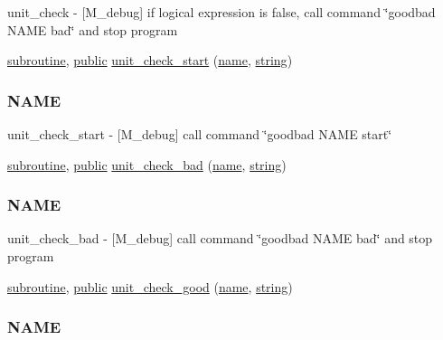 \begin{DoxyCompactItemize}
\begin{DoxyCompactList}
unit\+\_\+check -\/ \mbox{[}M\+\_\+debug\mbox{]} if logical expression is false, call command \char`\"{}goodbad N\+A\+M\+E bad\char`\"{} and stop program \end{DoxyCompactList}\item 
\hyperlink{M__stopwatch_83_8txt_acfbcff50169d691ff02d4a123ed70482}{subroutine}, \hyperlink{M__stopwatch_83_8txt_a2f74811300c361e53b430611a7d1769f}{public} \hyperlink{namespacem__debug_a6f1166b1f25f39931359c1aa1b2219e5}{unit\+\_\+check\+\_\+start} (\hyperlink{M__stopwatch_83_8txt_a3f508a893ae4c3b397b4383e33b9bcae}{name}, \hyperlink{what__overview_81_8txt_a74cb7e955273b9f9157b4f0c18a38849}{string})
\begin{DoxyCompactList}\small\item\em \subsubsection*{N\+A\+ME}

unit\+\_\+check\+\_\+start -\/ \mbox{[}M\+\_\+debug\mbox{]} call command \char`\"{}goodbad N\+A\+M\+E start\char`\"{} \end{DoxyCompactList}\item 
\hyperlink{M__stopwatch_83_8txt_acfbcff50169d691ff02d4a123ed70482}{subroutine}, \hyperlink{M__stopwatch_83_8txt_a2f74811300c361e53b430611a7d1769f}{public} \hyperlink{namespacem__debug_a668813eec59e4c16d3bbc2d317e8cdee}{unit\+\_\+check\+\_\+bad} (\hyperlink{M__stopwatch_83_8txt_a3f508a893ae4c3b397b4383e33b9bcae}{name}, \hyperlink{what__overview_81_8txt_a74cb7e955273b9f9157b4f0c18a38849}{string})
\begin{DoxyCompactList}\small\item\em \subsubsection*{N\+A\+ME}

unit\+\_\+check\+\_\+bad -\/ \mbox{[}M\+\_\+debug\mbox{]} call command \char`\"{}goodbad N\+A\+M\+E bad\char`\"{} and stop program \end{DoxyCompactList}\item 
\hyperlink{M__stopwatch_83_8txt_acfbcff50169d691ff02d4a123ed70482}{subroutine}, \hyperlink{M__stopwatch_83_8txt_a2f74811300c361e53b430611a7d1769f}{public} \hyperlink{namespacem__debug_acd67428a8900ec4c36bd3a7b28d56987}{unit\+\_\+check\+\_\+good} (\hyperlink{M__stopwatch_83_8txt_a3f508a893ae4c3b397b4383e33b9bcae}{name}, \hyperlink{what__overview_81_8txt_a74cb7e955273b9f9157b4f0c18a38849}{string})
\begin{DoxyCompactList}\small\item\em \subsubsection*{N\+A\+ME}


\end{DoxyCompactList}
\end{DoxyCompactItemize}
